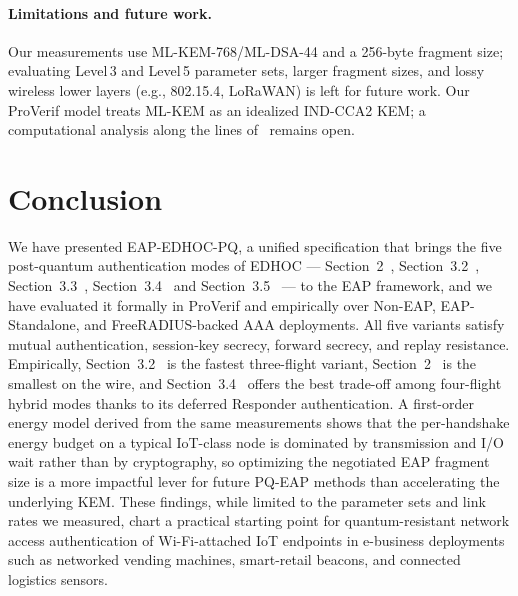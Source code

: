 \documentclass{easychair}
\newcommand{\VarSec}[1]{Section~#1~\cite{pq-edhoc-draft}}
\begin{document}
\paragraph{Limitations and future work.}
Our measurements use ML-KEM-768/ML-DSA-44 and a 256-byte fragment
size; evaluating Level\,3 and Level\,5 parameter sets, larger fragment
sizes, and lossy wireless lower layers (e.g., 802.15.4, LoRaWAN) is
left for future work. Our ProVerif model treats ML-KEM as an idealized
IND-CCA2 KEM; a computational analysis along the lines
of~\cite{Fer24,GM23} remains open.


\section{Conclusion}
\label{conclusion}
We have presented EAP-EDHOC-PQ, a unified specification that brings
the five post-quantum authentication modes of EDHOC --- \VarSec{2},
\VarSec{3.2}, \VarSec{3.3}, \VarSec{3.4} and \VarSec{3.5} --- to the
EAP framework, and we have evaluated it formally in ProVerif and
empirically over Non-EAP, EAP-Standalone, and FreeRADIUS-backed AAA
deployments. All five variants satisfy mutual authentication,
session-key secrecy, forward secrecy, and replay resistance.
Empirically, \VarSec{3.2} is the fastest three-flight variant,
\VarSec{2} is the smallest on the wire, and \VarSec{3.4} offers the
best trade-off among four-flight hybrid modes thanks to its deferred
Responder authentication. A first-order energy model derived from the
same measurements shows that the per-handshake energy budget on a
typical IoT-class node is dominated by transmission and I/O wait
rather than by cryptography, so optimizing the negotiated EAP
fragment size is a more impactful lever for future PQ-EAP methods
than accelerating the underlying KEM. These findings, while limited
to the parameter sets and link rates we measured, chart a practical
starting point for quantum-resistant network access authentication of
Wi-Fi-attached IoT endpoints in e-business deployments such as
networked vending machines, smart-retail beacons, and connected
logistics sensors.


\label{sect:bib}


\end{document}
